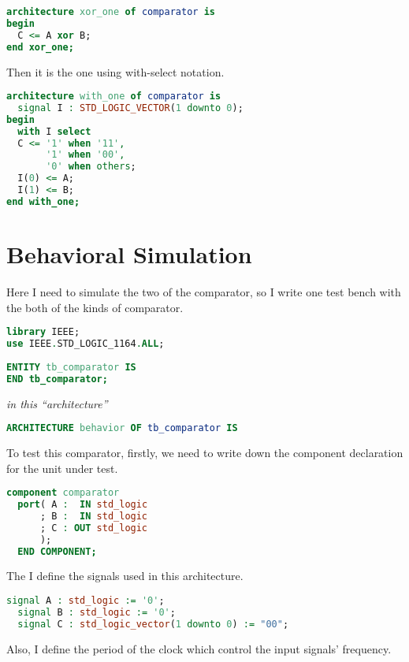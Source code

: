 \documentclass{article}
\begin{document}
\begin{lstlisting}[language=VHDL]
architecture xor_one of comparator is
begin
  C <= A xor B;
end xor_one;
\end{lstlisting}
    
    Then it is the one using with-select notation.

\begin{lstlisting}[language=VHDL]
architecture with_one of comparator is
  signal I : STD_LOGIC_VECTOR(1 downto 0);
begin
  with I select
  C <= '1' when '11',
       '1' when '00',
       '0' when others;
  I(0) <= A;
  I(1) <= B;
end with_one;
\end{lstlisting}


    \section{Behavioral Simulation}
    \label{sec:behavioralsimulation}

    Here I need to simulate the two of the comparator, so I write one test bench with the both of the kinds of comparator.

\begin{lstlisting}[language=VHDL]
library IEEE;
use IEEE.STD_LOGIC_1164.ALL;
 
ENTITY tb_comparator IS
END tb_comparator;
\end{lstlisting}

    \textit{in this ``architecture''}
\begin{lstlisting}[language=VHDL]
ARCHITECTURE behavior OF tb_comparator IS 
\end{lstlisting}
    
    To test this comparator, firstly, we need to write down the component declaration for the unit under test.

\begin{lstlisting}[language=VHDL]
  component comparator
  port( A :  IN std_logic
      ; B :  IN std_logic
      ; C : OUT std_logic
      );
  END COMPONENT;
\end{lstlisting}

    The I define the signals used in this architecture. 

\begin{lstlisting}[language=VHDL]
  signal A : std_logic := '0';
  signal B : std_logic := '0';
  signal C : std_logic_vector(1 downto 0) := "00";
\end{lstlisting}

    Also, I define the period of the clock which control the input signals' frequency.
\end{document}
